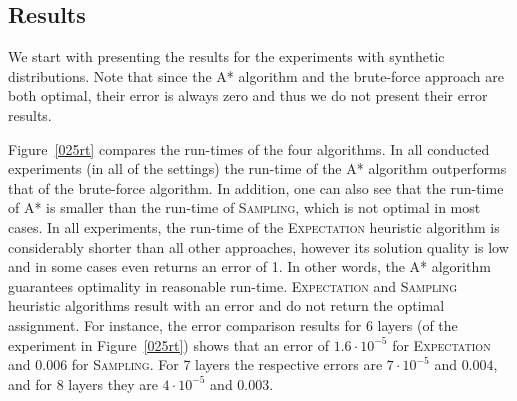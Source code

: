 \documentclass[letterpaper]{article} %
\newcommand{\astar}{\textsc{A*}\xspace}
\newcommand{\sampling}{\textsc{Sampling}\xspace}
\newcommand{\expectation}{\textsc{Expectation}\xspace}
\begin{document}

\subsection{Results}
\label{sec:res}

We start with presenting the results for the experiments with synthetic distributions. Note that since the \astar algorithm and the brute-force approach are both optimal, their error is always zero and thus we do not present their error results. 

Figure~\ref{025rt} compares the run-times of the four algorithms.
In all conducted experiments (in all of the settings) the run-time of the \astar algorithm outperforms that of the brute-force algorithm. In addition, one can also see that the run-time of \astar is smaller than the run-time of \sampling, which is not optimal in most cases. In all experiments, the run-time of the \expectation heuristic algorithm is considerably shorter than all other approaches, however its solution quality is low and in some cases even returns an error of 1. 
In other words, the \astar algorithm guarantees optimality in reasonable run-time. \expectation and \sampling heuristic algorithms result with an error and do not return the optimal assignment.
For instance, the error comparison results for 6 layers (of the experiment in Figure~\ref{025rt}) shows that an error of $1.6\cdot 10^{-5}$ for \expectation and $0.006$ for \sampling. For 7 layers the respective errors are $7 \cdot 10^{-5}$ and $0.004$, and for 8 layers they are $4 \cdot 10^{-5}$ and $0.003$. %
\end{document}
